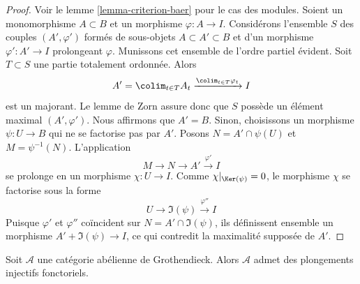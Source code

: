 \begin{proof}
Voir le lemme \ref{lemma-criterion-baer} pour le cas des modules.
Soient un monomorphisme $A \subset B$ et un morphisme $\varphi : A \to I$.
Considérons l'ensemble $S$ des couples $(A', \varphi')$ formés de
sous-objets $A \subset A' \subset B$ et d'un morphisme $\varphi' : A' \to I$
prolongeant $\varphi$. Munissons cet ensemble de l'ordre partiel évident.
Soit $T \subset S$ une partie totalement ordonnée. Alors
$$
A' = \colim_{t \in T} A_t \xrightarrow{\colim_{t \in T} \varphi_t} I
$$
est un majorant. Le lemme de Zorn assure donc que $S$ possède un élément
maximal $(A', \varphi')$. Nous affirmons que $A' = B$. Sinon, choisissons
un morphisme $\psi : U \to B$ qui ne se factorise pas par $A'$. Posons
$N = A' \cap \psi(U)$ et $M = \psi^{-1}(N)$. L'application
$$
M \to N \to A' \xrightarrow{\varphi'} I
$$
se prolonge en un morphisme $\chi : U \to I$. Comme
$\chi|_{\Ker(\psi)} = 0$, le morphisme $\chi$ se factorise sous la forme
$$
U \to \Im(\psi) \xrightarrow{\varphi''} I
$$
Puisque $\varphi'$ et $\varphi''$ coïncident sur
$N = A' \cap \Im(\psi)$, ils définissent ensemble un morphisme
$A' + \Im(\psi) \to I$, ce qui contredit la maximalité supposée de $A'$.
\end{proof}

\begin{theorem}
\label{theorem-injective-embedding-grothendieck}
Soit $\mathcal{A}$ une catégorie abélienne de Grothendieck.
Alors $\mathcal{A}$ admet des plongements injectifs fonctoriels.
\end{theorem}

